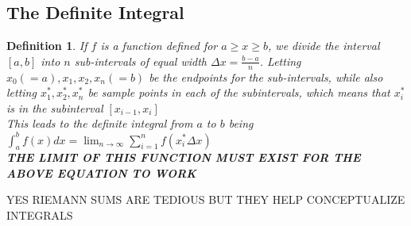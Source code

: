 \documentclass[10pt,a4paper]{article}
\newtheorem{definition}{Definition}
\begin{document}
	\subsection{The Definite Integral}
		\begin{definition}
			If $f$ is a function defined for $a\geq x \geq b$, we divide the interval $[a,b]$ into $n$ sub-intervals of equal width $\Delta{x} = \frac{b-a}{n}$. Letting $x_{0}(=a),x_{1}, x_{2}, x_{n}(=b)$ be the endpoints for the sub-intervals, while also letting $x_{1}^{*} , x_{2}^{*} , x_{n}^{*}$ be sample points in each of the subintervals, which means that $x_{i}^{*}$ is in the subinterval $[x_{i-1}, x_{i}]$
\\			This leads to the definite integral from $a$ to $b$ being $\int_{a}^{b} f(x)dx = \lim_{n \rightarrow \infty}{\sum_{i=1}^{n}{f(x_{i}^{*}\Delta{x})}}$
\\			\textbf{THE LIMIT OF THIS FUNCTION MUST EXIST FOR THE ABOVE EQUATION TO WORK}
		\end{definition}

			YES RIEMANN SUMS ARE TEDIOUS BUT THEY HELP CONCEPTUALIZE INTEGRALS
\end{document}
